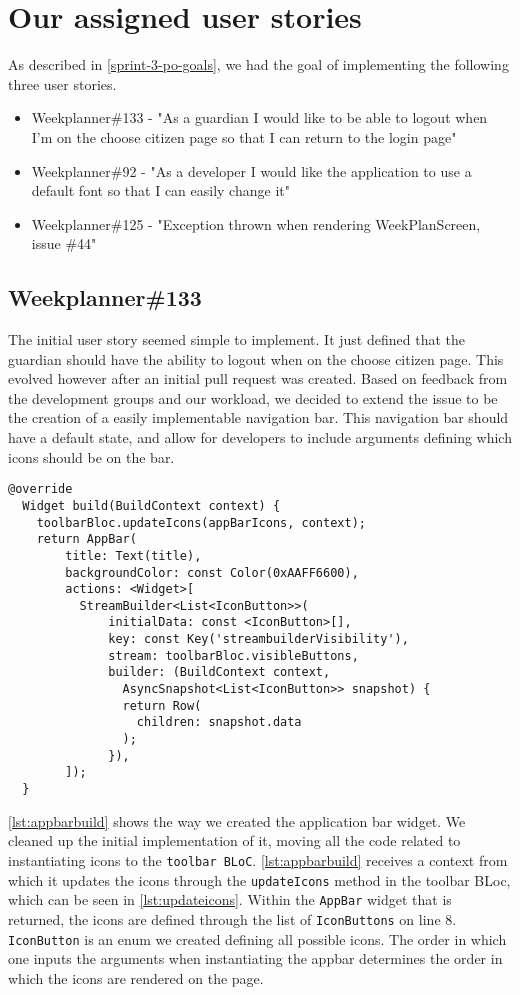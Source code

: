 \section{Our assigned user stories}
As described in \autoref{sprint-3-po-goals}, we had the goal of implementing the following three user stories.
\begin{itemize}\label{item:our-stories-sprint-3}
    \item Weekplanner\#133 - "As a guardian I would like to be able to logout when I'm on the choose citizen page so that I can return to the login page"
    \item Weekplanner\#92 - "As a developer I would like the application to use a default font so that I can easily change it"
    \item Weekplanner\#125 - "Exception thrown when rendering WeekPlanScreen, issue \#44"
\end{itemize}

\subsection{Weekplanner\#133}
The initial user story seemed simple to implement.
It just defined that the guardian should have the ability to logout when on the choose citizen page.
This evolved however after an initial pull request was created.
Based on feedback from the development groups and our workload, we decided to extend the issue to be the creation of a easily implementable navigation bar.
This navigation bar should have a default state, and allow for developers to include arguments defining which icons should be on the bar.

\begin{lstlisting}[caption={Building the appbar},label={lst:appbarbuild}]
  @override
  Widget build(BuildContext context) {
    toolbarBloc.updateIcons(appBarIcons, context);
    return AppBar(
        title: Text(title),
        backgroundColor: const Color(0xAAFF6600),
        actions: <Widget>[
          StreamBuilder<List<IconButton>>(
              initialData: const <IconButton>[],
              key: const Key('streambuilderVisibility'),
              stream: toolbarBloc.visibleButtons,
              builder: (BuildContext context, 
                AsyncSnapshot<List<IconButton>> snapshot) {
                return Row(
                  children: snapshot.data
                );
              }),
        ]);
  }
\end{lstlisting}
\autoref{lst:appbarbuild} shows the way we created the application bar widget.
We cleaned up the initial implementation of it, moving all the code related to instantiating icons to the \texttt{toolbar BLoC}.
\autoref{lst:appbarbuild} receives a context from which it updates the icons through the \texttt{updateIcons} method in the toolbar BLoc, which can be seen in \autoref{lst:updateicons}.
Within the \texttt{AppBar} widget that is returned, the icons are defined through the list of \texttt{IconButtons} on line 8.
\texttt{IconButton} is an enum we created defining all possible icons.
The order in which one inputs the arguments when instantiating the appbar determines the order in which the icons are rendered on the page. 

